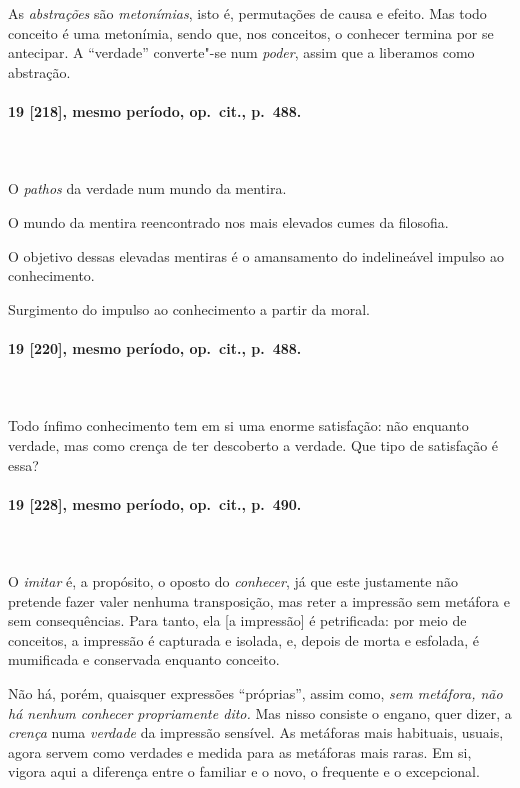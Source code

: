 As \textit{abstrações} são \textit{metonímias}, isto é, permutações de
causa e efeito. Mas todo conceito é uma metonímia, sendo que, nos
conceitos, o conhecer termina por se antecipar. A “verdade”
converte"-se num \textit{poder}, assim que a liberamos como
abstração. 

\pagebreak
\paragraph*{19 [218], mesmo período, op.~cit., p.~488.}
\ \\
\ \\

O \textit{pathos} da verdade num mundo da mentira.

O mundo da mentira reencontrado nos mais elevados cumes da filosofia.

O objetivo dessas elevadas mentiras é o amansamento do indelineável
impulso ao conhecimento. 

Surgimento do impulso ao conhecimento a partir da moral.

\pagebreak
\paragraph*{19 [220], mesmo período, op.~cit., p.~488.}
\ \\
\ \\

Todo ínfimo conhecimento tem em si uma enorme satisfação: não enquanto
verdade, mas como crença de ter descoberto a verdade. Que tipo de
satisfação é essa?

\pagebreak
\paragraph*{19 [228], mesmo período, op.~cit., p.~490.}
\ \\
\ \\

O \textit{imitar} é, a propósito, o oposto do \textit{conhecer}, já que
este justamente não pretende fazer valer nenhuma transposição, mas
reter a impressão sem metáfora e sem consequências. Para tanto, ela [a
impressão] é petrificada: por meio de conceitos, a impressão é
capturada e isolada, e, depois de morta e esfolada, é mumificada e
conservada enquanto conceito.

Não há, porém, quaisquer expressões “próprias”, assim como, \textit{sem
metáfora, não há nenhum conhecer propriamente dito.} Mas nisso consiste
o engano, quer dizer, a \textit{crença} numa \textit{verdade} da
impressão sensível. As metáforas mais habituais, usuais, agora servem
como verdades e medida para as metáforas mais raras. Em si, vigora aqui
a diferença entre o familiar e o novo, o frequente e o excepcional.


